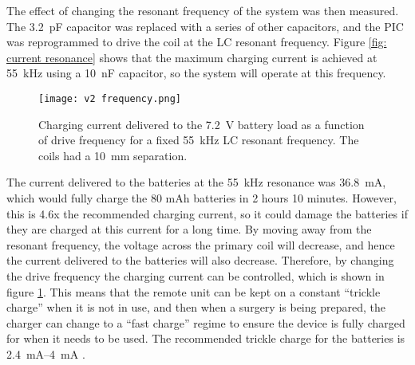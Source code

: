 The effect of changing the resonant frequency of the system was then measured. The \SI{3.2}{\pico\farad} capacitor was replaced with a series of other capacitors, and the PIC was reprogrammed to drive the coil at the LC resonant frequency. Figure \ref{fig: current resonance} shows that the maximum charging current is achieved at \SI{55}{\kilo\hertz} using a \SI{10}{\nano\farad} capacitor, so the system will operate at this frequency.\\ 


\begin{figure}[htb]
	\centering
	\texttt{[image: v2 frequency.png]}
	\caption{Charging current delivered to the \SI{7.2}{\volt} battery load as a function of drive frequency for a fixed \SI{55}{\kilo\hertz} LC resonant frequency. The coils had a \SI{10}{\milli\metre} separation.}
	\label{fig: current frequency}
\end{figure}

The current delivered to the batteries at the \SI{55}{\kilo\hertz} resonance was \SI{36.8}{\milli\ampere}, which would fully charge the 80 mAh batteries in 2 hours 10 minutes. However, this is 4.6x the recommended charging current, so it could damage the batteries if they are charged at this current for a long time. By moving away from the resonant frequency, the voltage across the primary coil will decrease, and hence the current delivered to the batteries will also decrease. Therefore, by changing the drive frequency the charging current can be controlled, which is shown in figure \ref{fig: current frequency}. This means that the remote unit can be kept on a constant ``trickle charge'' when it is not in use, and then when a surgery is being prepared, the charger can change to a ``fast charge'' regime to ensure the device is fully charged for when it needs to be used. The recommended trickle charge for the batteries is \SIrange{2.4}{4}{\milli\ampere} \cite{rs_pro_batteries}.\\

